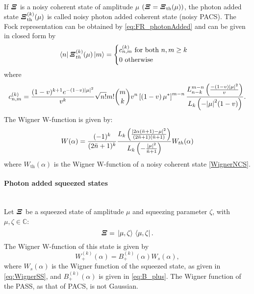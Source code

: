         If $\bm{\relax{\varXi}}$ is a noisy coherent state of amplitude $\mu$ 
        $(\bm{\relax{\varXi}}=\bm{\relax{\varXi}}_{\mathrm{th}}(\mu))$,
        the photon added state $\bm{\relax{\varXi}}_{\mathrm{th}}^{(k)}(\mu)$ is called noisy photon added coherent state
        (noisy PACS).
        The Fock representation can be obtained by \ref{eq:FR_photonAdded} and can be given in closed
        form by \cite{PACSDisc}
        \begin{equation}
            \bra{n}\bm{\relax{\varXi}}_{th}^{(k)}(\mu)\ket{m}=
            \begin{cases}
                c_{n,m}^{(k)} \mbox{\ for\ both\ } n,m \geq k\\
                0\mbox{\ otherwise}
            \end{cases}
        \end{equation}
        where
        \begin{equation*}
            c_{n,m}^{(k)}=\frac{(1-v)^{k+1}e^{-(1-v)\absolutevalue{\mu}^2}}{v^k}
            \sqrt{n!}{m!}\binom{m}{k} v^n \left[\left(1-v\right)\mu^*\right]^{m-n}
            \frac{L^{m-n}_{n-k} \left( \frac{-(1-v)\absolutevalue{\mu}^2}{v} \right)}
            {L_k \left( -\absolutevalue{\mu}^2 (1-v) \right)}.
        \end{equation*}
        The Wigner W-function is given by:
        \begin{equation}
            W(\alpha)=\frac{(-1)^k}{(2\bar{n}+1)^k}\frac{L_k \left( 
                \frac{\absolutevalue{2\alpha(\bar{n}+1)-\mu}^2}{(2\bar{n}+1)(\bar{n}+1)} \right)}
                {L_k \left(-\frac{\absolutevalue{\mu}^2}{\bar{n}+1} \right)} W_{th}(\alpha)
        \end{equation}
        where $W_{\mathrm{th}}(\alpha)$ is the Wigner W-function of a noisy coherent state \ref{WignerNCS}.
        
        \paragraph{Photon added squeezed states}\mbox{}\\
        \label{PASSs}
        Let $\bm{\relax{\varXi}}$ be a squeezed state of amplitude $\mu$ and squeezing parameter $\zeta$,
        with $\mu,\zeta \in \mathbb{C}$:
        \begin{equation*}
            \bm{\relax{\varXi}}=\ket*{\mu,\zeta}\bra*{\mu,\zeta}.
        \end{equation*}
        The Wigner W-function of this state is given by
        \begin{equation}
            W_+^{(k)}(\alpha) = B_+^{(k)}(\alpha) W_s(\alpha),
        \end{equation}
        where $W_s(\alpha)$ is the Wigner function of the squeezed state, as given in 
        \ref{eq:WignerSS}, and $B_+^{(k)}(\alpha)$ is 
        given in \ref{eq:B_plus}.
        The Wigner function of the PASS, as that of PACS, is not Gaussian.

